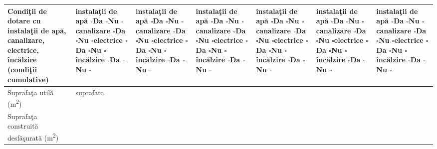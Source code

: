 \documentclass[8pt,a4paper,landscape]{extarticle}
\renewcommand{\arraystretch}{1.0}
\newcommand{\checkboxempty}{$\square$}
\begin{document}
\begin{tabularx}{\textwidth}{|m{2.6cm}|X|X|X|X|X|X|}
Condiţii de dotare cu instalaţii de apă, canalizare, electrice, încălzire (condiţii cumulative) & instalaţii de apă \checkboxempty \quad Da \checkboxempty \quad Nu \checkboxempty \newline canalizare \checkboxempty \quad Da \checkboxempty \quad Nu \checkboxempty \newline electrice \checkboxempty \quad Da \checkboxempty \quad Nu \checkboxempty \newline încălzire \checkboxempty \quad Da \checkboxempty \quad Nu \checkboxempty & instalaţii de apă \checkboxempty \quad Da \checkboxempty \quad Nu \checkboxempty \newline canalizare \checkboxempty \quad Da \checkboxempty \quad Nu \checkboxempty \newline electrice \checkboxempty \quad Da \checkboxempty \quad Nu \checkboxempty \newline încălzire \checkboxempty \quad Da \checkboxempty \quad Nu \checkboxempty & instalaţii de apă \checkboxempty \quad Da \checkboxempty \quad Nu \checkboxempty \newline canalizare \checkboxempty \quad Da \checkboxempty \quad Nu \checkboxempty \newline electrice \checkboxempty \quad Da \checkboxempty \quad Nu \checkboxempty \newline încălzire \checkboxempty \quad Da \checkboxempty \quad Nu \checkboxempty & instalaţii de apă \checkboxempty \quad Da \checkboxempty \quad Nu \checkboxempty \newline canalizare \checkboxempty \quad Da \checkboxempty \quad Nu \checkboxempty \newline electrice \checkboxempty \quad Da \checkboxempty \quad Nu \checkboxempty \newline încălzire \checkboxempty \quad Da \checkboxempty \quad Nu \checkboxempty & instalaţii de apă \checkboxempty \quad Da \checkboxempty \quad Nu \checkboxempty \newline canalizare \checkboxempty \quad Da \checkboxempty \quad Nu \checkboxempty \newline electrice \checkboxempty \quad Da \checkboxempty \quad Nu \checkboxempty \newline încălzire \checkboxempty \quad Da \checkboxempty \quad Nu \checkboxempty & instalaţii de apă \checkboxempty \quad Da \checkboxempty \quad Nu \checkboxempty \newline canalizare \checkboxempty \quad Da \checkboxempty \quad Nu \checkboxempty \newline electrice \checkboxempty \quad Da \checkboxempty \quad Nu \checkboxempty \newline încălzire \checkboxempty \quad Da \checkboxempty \quad Nu \checkboxempty \\
\hline
Suprafaţa utilă (m\textsuperscript{2}) & {{suprafata}} & & & & & \\
\hline
Suprafaţa construită desfăşurată (m\textsuperscript{2}) & & & & & & \\
\hline
\end{tabularx}
\renewcommand{\arraystretch}{1}
\end{document}
